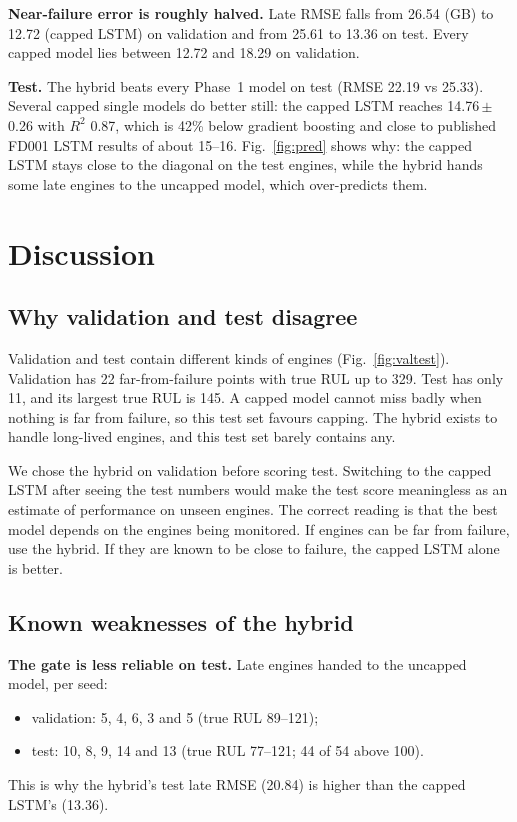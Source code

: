 \documentclass[conference]{IEEEtran}
\begin{document}
\textbf{Near-failure error is roughly halved.} Late RMSE falls from 26.54 (GB) to 12.72 (capped LSTM) on validation and from 25.61 to 13.36 on test. Every capped model lies between 12.72 and 18.29 on validation.

\textbf{Test.} The hybrid beats every Phase~1 model on test (RMSE 22.19 vs 25.33). Several capped single models do better still: the capped LSTM reaches 14.76\,$\pm$\,0.26 with $R^2$ 0.87, which is 42\% below gradient boosting and close to published FD001 LSTM results of about 15--16. Fig.~\ref{fig:pred} shows why: the capped LSTM stays close to the diagonal on the test engines, while the hybrid hands some late engines to the uncapped model, which over-predicts them.


\section{Discussion}
\label{sec:discussion}

\subsection{Why validation and test disagree}
Validation and test contain different kinds of engines (Fig.~\ref{fig:valtest}). Validation has 22 far-from-failure points with true RUL up to 329. Test has only 11, and its largest true RUL is 145. A capped model cannot miss badly when nothing is far from failure, so this test set favours capping. The hybrid exists to handle long-lived engines, and this test set barely contains any.

We chose the hybrid on validation before scoring test. Switching to the capped LSTM after seeing the test numbers would make the test score meaningless as an estimate of performance on unseen engines. The correct reading is that the best model depends on the engines being monitored. If engines can be far from failure, use the hybrid. If they are known to be close to failure, the capped LSTM alone is better.


\subsection{Known weaknesses of the hybrid}
\textbf{The gate is less reliable on test.} Late engines handed to the uncapped model, per seed:
\begin{itemize}
  \item validation: 5, 4, 6, 3 and 5 (true RUL 89--121);
  \item test: 10, 8, 9, 14 and 13 (true RUL 77--121; 44 of 54 above 100).
\end{itemize}
This is why the hybrid's test late RMSE (20.84) is higher than the capped LSTM's (13.36).
\end{document}
